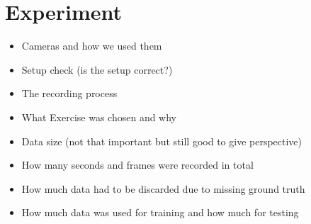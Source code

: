 \chapter{Experiment}

\begin{itemize}
  \item Cameras and how we used them
  \item Setup check (is the setup correct?)
  \item The recording process
  \item What Exercise was chosen and why
  \item Data size (not that important but still good to give perspective)
  \item How many seconds and frames were recorded in total
  \item How much data had to be discarded due to missing ground truth
  \item How much data was used for training and how much for testing
\end{itemize}
